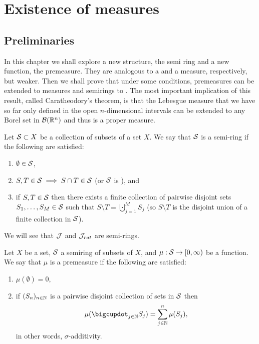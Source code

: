 
\chapter{Existence of measures}

\section{Preliminaries}

In this chapter we shall explore a new structure, the semi ring and a new function, the premeasure. They are analogous to a \siga and a measure, respectively, but weaker. Then we shall prove that under some conditions, premeasures can be extended to measures and semirings to \sigas. The most important implication of this result, called Caratheodory's theorem, is that the Lebesgue measure that we have so far only defined in the open $n$-dimensional intervals can be extended to any Borel set in $\mathcal{B}(\mathbb{R}^n)$ and thus is a proper measure.


\begin{dfn}
	\label{dfn:semiring}
	Let $\mathcal{S} \subset X$ be a collection of subsets of a set $X$. We say that $\mathcal{S}$ is a semi-ring if the following are satisfied:
	\begin{enumerate}
		\item $\emptyset \in \mathcal{S}$,
		\item $S, T \in \mathcal{S} \implies S \cap T \in \mathcal{S}$ (or $\mathcal{S}$ is \istable), and
		\item if $S, T \in \mathcal{S}$ then there exists a finite collection of pairwise disjoint sets $S_1, \dots, S_M \in \mathcal{S}$ such that $S\setminus T = \bigcupdot_{j = 1}^M S_j$ (so $S\setminus T$ is the disjoint union of a finite collection in $\mathcal{S}$).
	\end{enumerate}
\end{dfn}

We will see that $\mathcal{J}$ and $\mathcal{J}_{rat}$ are semi-rings.

\begin{dfn}[Premeasure]
	Let $X$ be a set, $\mathcal{S}$ a semiring of subsets of $X$, and $\mu: \mathcal{S} \to [0, \infty)$ be a function. We say that $\mu$ is a premeasure if the following are satisfied:
	\begin{enumerate}
		\item $\mu(\emptyset) = 0$,
		\item if $(S_n)_{n \in \mathbb{N}}$ is a pairwise disjoint collection of sets in $\mathcal{S}$ then
		\begin{align*}
			\mu(\bigcupdot_{j \in \N} S_j) = \sum_{j \in \N}^n \mu(S_j),
		\end{align*}
		in other words, $\sigma$-additivity.
	\end{enumerate}
\end{dfn}

